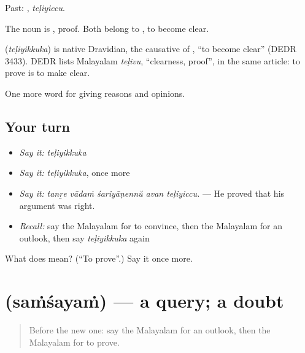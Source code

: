 Past: , \emph{teḷiyiccu}.

The noun is , proof. Both belong to , to become clear.

\begin{cousinweb}
\textbf{} (\emph{teḷiyikkuka}) is native Dravidian, the causative of , \textquotedblleft{}to become clear\textquotedblright{} (DEDR 3433). DEDR lists Malayalam \emph{teḷivu}, \textquotedblleft{}clearness, proof\textquotedblright{}, in the same article: to prove is to make clear.
\end{cousinweb}

\begin{grammarlens}[title={What you've built}]
One more word for giving reasons and opinions.
\end{grammarlens}

\subsection*{Your turn}
\begin{itemize}
\raggedright
  \item \emph{Say it:} \emph{teḷiyikkuka}
  \item \emph{Say it:} \emph{teḷiyikkuka}, once more
  \item \emph{Say it:} \emph{tanṟe vādaṁ śariyāṇennŭ avan teḷiyiccu.} — He proved that his argument was right.
  \item \emph{Recall:} say the Malayalam for to convince, then the Malayalam for an outlook, then say \emph{teḷiyikkuka} again
\end{itemize}

\begin{tcolorbox}[breakable,colback=teal!4,colframe=teal!35!black,title={Before you move on}]
What does  mean? (\textquotedblleft{}To prove\textquotedblright{}.) Say it once more.
\end{tcolorbox}
\section[\texorpdfstring{\ml{സംശയം} (saṁśayaṁ)}{സംശയം (saṁśayaṁ)}]{ (saṁśayaṁ) — a query; a doubt}

\label{lesson:ML-C407-samsayam}



\begin{quote}
Before the new one: say the Malayalam for an outlook, then the Malayalam for to prove.
\end{quote}


